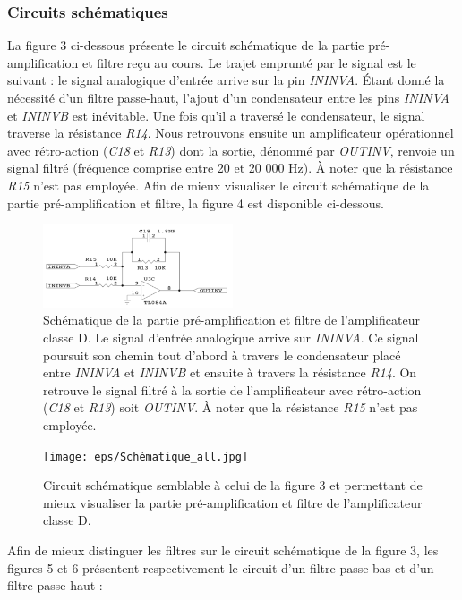 \documentclass[10pt, oneside, a4paper]{article}
\begin{document}
\subsubsection{Circuits schématiques}
La figure 3 ci-dessous présente le circuit schématique de la partie pré-amplification et filtre reçu au cours. Le trajet emprunté par le signal est le suivant : le signal analogique d'entrée arrive sur la pin \textit{ININVA}. Étant donné la nécessité d'un filtre passe-haut, l'ajout d'un condensateur entre les pins \textit{ININVA} et \textit{ININVB} est inévitable. Une fois qu'il a traversé le condensateur, le signal traverse la résistance \textit{R14}. Nous retrouvons ensuite un amplificateur opérationnel avec rétro-action (\textit{C18} et \textit{R13}) dont la sortie, dénommé par \textit{OUTINV}, renvoie un signal filtré (fréquence comprise entre 20 et 20 000 Hz). À noter que la résistance \textit{R15} n'est pas employée.
Afin de mieux visualiser le circuit schématique de la partie pré-amplification et filtre, la figure 4 est disponible ci-dessous.

\begin{figure}
    \centering
    \includegraphics[width=0.5\textwidth]{eps/Schematique_All.jpg}
    \caption{Schématique de la partie pré-amplification et filtre de l'amplificateur classe D. 
             Le signal d'entrée analogique arrive sur \textit{ININVA}. Ce signal poursuit son chemin tout d'abord à travers le condensateur placé entre \textit{ININVA} et \textit{ININVB} et ensuite à travers la résistance \textit{R14}. On retrouve le signal filtré à la sortie de l'amplificateur avec rétro-action (\textit{C18} et \textit{R13}) soit \textit{OUTINV}. À noter que la résistance \textit{R15} n'est pas employée.}
\end{figure}

\begin{figure}
    \centering
    \texttt{[image: eps/Schématique\_all.jpg]}
    \caption{Circuit schématique semblable à celui de la figure 3 et permettant de mieux visualiser la partie pré-amplification et filtre de l'amplificateur classe D.}
\end{figure}

Afin de mieux distinguer les filtres sur le circuit schématique de la figure 3, les figures 5 et 6 présentent respectivement le circuit d'un filtre passe-bas et d'un filtre passe-haut : 
\end{document}

